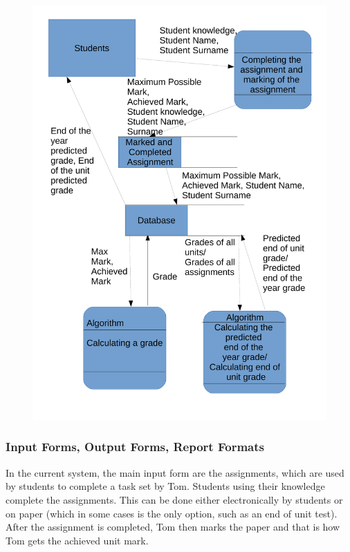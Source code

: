 \begin{figure}[H]
    \includegraphics[width=\textwidth]{./Analysis/images/222DataFlowDiagram.pdf}
\end{figure}

\subsubsection{Input Forms, Output Forms, Report Formats}

In the current system, the main input form are the assignments, which are used by students to complete a task set by Tom. Students using their knowledge complete the assignments. This can be done either electronically by students or on paper (which in some cases is the only option, such as an end of unit test). After the assignment is completed, Tom then marks the paper and that is how Tom gets the achieved unit mark. 

